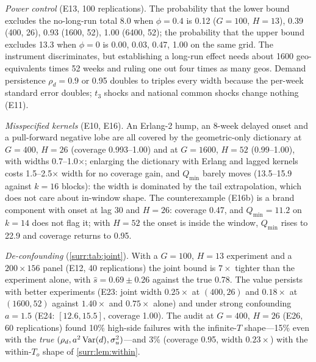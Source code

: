 \emph{Power control} (E13, 100 replications). The probability that the lower bound excludes the no-long-run total 8.0 when $\phi = 0.4$ is 0.12 ($G = 100$, $H = 13$), 0.39 (400, 26), 0.93 (1600, 52), 1.00 (6400, 52); the probability that the upper bound excludes 13.3 when $\phi = 0$ is 0.00, 0.03, 0.47, 1.00 on the same grid. The instrument discriminates, but establishing a long-run effect needs about 1600 geo-equivalents times 52 weeks and ruling one out four times as many geos. Demand persistence $\rho_d = 0.9$ or 0.95 doubles to triples every width because the per-week standard error doubles; $t_3$ shocks and national common shocks change nothing (E11).

\emph{Misspecified kernels} (E10, E16). An Erlang-2 hump, an 8-week delayed onset and a pull-forward negative lobe are all covered by the geometric-only dictionary at $G = 400$, $H = 26$ (coverage 0.993--1.00) and at $G = 1600$, $H = 52$ (0.99--1.00), with widths 0.7--1.0$\times$; enlarging the dictionary with Erlang and lagged kernels costs 1.5--2.5$\times$ width for no coverage gain, and $Q_{\min}$ barely moves (13.5--15.9 against $k = 16$ blocks): the width is dominated by the tail extrapolation, which does not care about in-window shape. The counterexample (E16b) is a brand component with onset at lag 30 and $H = 26$: coverage 0.47, and $Q_{\min} = 11.2$ on $k = 14$ does not flag it; with $H = 52$ the onset is inside the window, $Q_{\min}$ rises to 22.9 and coverage returns to 0.95.

\emph{De-confounding} (\cref{surr:tab:joint}). With a $G = 100$, $H = 13$ experiment and a $200 \times 156$ panel (E12, 40 replications) the joint bound is $7\times$ tighter than the experiment alone, with $\hat s = 0.69 \pm 0.26$ against the true 0.78. The value persists with better experiments (E23: joint width $0.25\times$ at $(400, 26)$ and $0.18\times$ at $(1600, 52)$ against $1.40\times$ and $0.75\times$ alone) and under strong confounding $a = 1.5$ (E24: $[12.6, 15.5]$, coverage 1.00). The audit at $G = 400$, $H = 26$ (E26, 60 replications) found 10\% high-side failures with the infinite-$T$ shape---15\% even with the \emph{true} $(\rho_d, a^2\operatorname{Var}(d), \sigma_u^2)$---and 3\% (coverage 0.95, width $0.23\times$) with the within-$T_o$ shape of \cref{surr:lem:within}.

